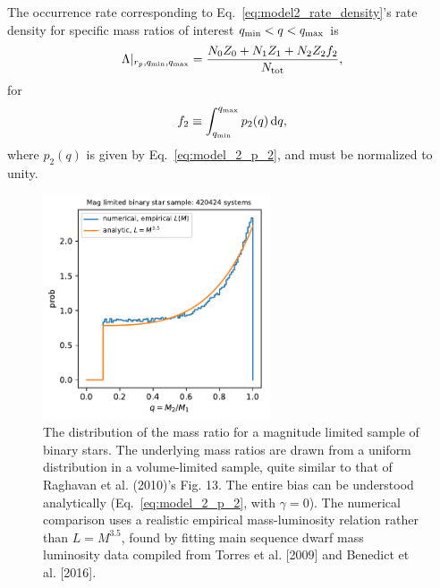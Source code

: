 The occurrence rate corresponding to Eq.~\ref{eq:model2_rate_density}'s rate 
density for specific mass ratios of interest $q_{\rm min} < q < q_{\rm 
max}$ is
\begin{equation}
\Lambda|_{r_p,q_{\rm min},q_{\rm max}} = 
\frac{N_0 Z_0 + N_1 Z_1 + N_2 Z_2 f_2}
{N_{\rm tot}},
\end{equation}
for
\begin{equation}
f_2 \equiv
\int_{q_{\rm min}}^{q_{\rm max}} p_2(q) \,{\rm d}q,
\end{equation}
where $p_2(q)$ is given by Eq.~\ref{eq:model_2_p_2}, and must be normalized to 
unity.


\begin{figure}[!tb]
    \centering
    \includegraphics[width=0.6\textwidth]{figures/q_distribn_mag_limited.pdf}
    \caption{
        The distribution of the mass ratio for a magnitude limited sample of 
        binary stars. The underlying mass ratios are drawn from a uniform 
        distribution in a volume-limited sample, quite similar to that of 
        Raghavan 
        et al. (2010)'s Fig. 13.
        The entire bias can be understood analytically 
        (Eq.~\ref{eq:model_2_p_2},
        with $\gamma=0$).
        The numerical comparison uses a realistic empirical mass-luminosity 
        relation rather than $L=M^{3.5}$, found by fitting main sequence dwarf 
        mass luminosity data compiled from Torres et al. [2009] and Benedict 
        et 
        al. [2016].
    }
    \label{fig:q_distribn_mag_limited}
\end{figure}



